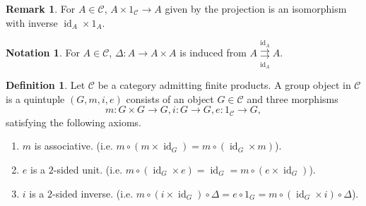 \documentclass[10pt]{article}
\numberwithin{equation}{section}
\theoremstyle{definition}
\newtheorem{definition}{Definition}[section]
\newtheorem{notation}{Notation}[section]
\newtheorem{remark}{Remark}[section]
\DeclareMathOperator{\id}{id}
\newcommand{\sC}[0]{\mathscr{C}}
\begin{document}

\begin{remark}
    For $A\in\sC$, $A\times 1_\sC\to A$ given by the projection is an isomorphism with inverse $\id_A\times 1_A$.
\end{remark}

\begin{notation}
    For $A\in\sC$, $\Delta:A\to A\times A$ is induced from $A\overset{\id_A}{\underset{\id_A}{\rightrightarrows}} A$.
\end{notation}

\begin{definition}
    \label{definition_1_1}
    Let $\sC$ be a category admitting finite products. A group object in $\sC$ is a quintuple $(G,m,i,e)$ consists of an object $G\in\sC$ and three morphisms
    \begin{equation*}
        m:G\times G\to G, i:G\to G, e:1_\sC\to G,
    \end{equation*}
    satisfying the following axioms.
    \begin{enumerate}
        \item $m$ is associative. (i.e. $m\circ(m\times\id_G) = m\circ(\id_G\times m)$).
        \begin{center}
        \end{center}
        \item $e$ is a $2$-sided unit. (i.e. $m\circ(\id_G\times e) = \id_G = m\circ(e\times \id_G)$).
        \begin{center}
        \end{center}
        \item $i$ is a $2$-sided inverse. (i.e. $m\circ(i\times\id_G)\circ\Delta = e\circ 1_G = m\circ(\id_G\times i)\circ \Delta$).

\end{enumerate}
\end{definition}
\end{document}
